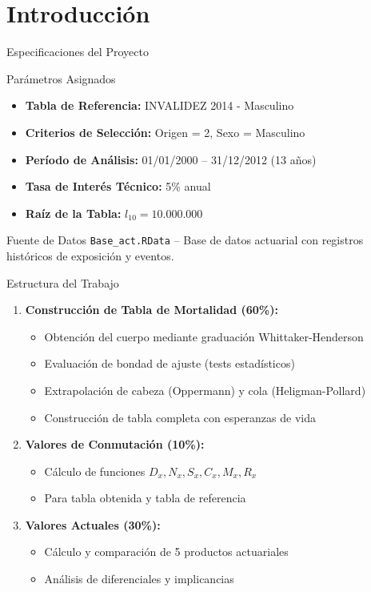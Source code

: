 \section{Introducción}

\begin{frame}{Especificaciones del Proyecto}
  \begin{block}{Parámetros Asignados}
    \begin{itemize}
      \item \textbf{Tabla de Referencia:} INVALIDEZ 2014 - Masculino
      \item \textbf{Criterios de Selección:} Origen = 2, Sexo = Masculino
      \item \textbf{Período de Análisis:} 01/01/2000 -- 31/12/2012 (13 años)
      \item \textbf{Tasa de Interés Técnico:} 5\% anual
      \item \textbf{Raíz de la Tabla:} $l_{10} = 10.000.000$
    \end{itemize}
  \end{block}
  
  \vspace{0.3cm}
  
  \begin{alertblock}{Fuente de Datos}
    \texttt{Base\_act.RData} -- Base de datos actuarial con registros históricos de exposición y eventos.
  \end{alertblock}
\end{frame}

\begin{frame}{Estructura del Trabajo}
  \begin{enumerate}
    \item \textbf{Construcción de Tabla de Mortalidad (60\%):}
      \begin{itemize}
        \item Obtención del cuerpo mediante graduación Whittaker-Henderson
        \item Evaluación de bondad de ajuste (tests estadísticos)
        \item Extrapolación de cabeza (Oppermann) y cola (Heligman-Pollard)
        \item Construcción de tabla completa con esperanzas de vida
      \end{itemize}
    \item \textbf{Valores de Conmutación (10\%):}
      \begin{itemize}
        \item Cálculo de funciones $D_x, N_x, S_x, C_x, M_x, R_x$
        \item Para tabla obtenida y tabla de referencia
      \end{itemize}
    \item \textbf{Valores Actuales (30\%):}
      \begin{itemize}
        \item Cálculo y comparación de 5 productos actuariales
        \item Análisis de diferenciales y implicancias
      \end{itemize}
  \end{enumerate}
\end{frame}

